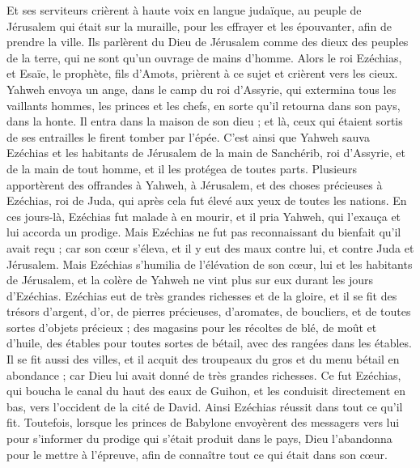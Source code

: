 \begin{multicols}{2}
Et ses serviteurs crièrent à haute voix en langue judaïque, au peuple de Jérusalem qui était sur la muraille, pour les effrayer et les épouvanter, afin de prendre la ville.
Ils parlèrent du Dieu de Jérusalem comme des dieux des peuples de la terre, qui ne sont qu'un ouvrage de mains d'homme.
Alors le roi Ezéchias, et Esaïe, le prophète, fils d'Amots, prièrent à ce sujet et crièrent vers les cieux.
Yahweh envoya un ange, dans le camp du roi d'Assyrie, qui extermina tous les vaillants hommes, les princes et les chefs, en sorte qu'il retourna dans son pays, dans la honte. Il entra dans la maison de son dieu ; et là, ceux qui étaient sortis de ses entrailles le firent tomber par l'épée.
C’est ainsi que Yahweh sauva Ezéchias et les habitants de Jérusalem de la main de Sanchérib, roi d'Assyrie, et de la main de tout homme, et il les protégea de toutes parts.
Plusieurs apportèrent des offrandes à Yahweh, à Jérusalem, et des choses précieuses à Ezéchias, roi de Juda, qui après cela fut élevé aux yeux de toutes les nations.
En ces jours-là, Ezéchias fut malade à en mourir, et il pria Yahweh, qui l'exauça et lui accorda un prodige.
Mais Ezéchias ne fut pas reconnaissant du bienfait qu'il avait reçu ; car son cœur s'éleva, et il y eut des maux contre lui, et contre Juda et Jérusalem.
Mais Ezéchias s'humilia de l'élévation de son cœur, lui et les habitants de Jérusalem, et la colère de Yahweh ne vint plus sur eux durant les jours d'Ezéchias.
Ezéchias eut de très grandes richesses et de la gloire, et il se fit des trésors d'argent, d'or, de pierres précieuses, d'aromates, de boucliers, et de toutes sortes d'objets précieux ;
des magasins pour les récoltes de blé, de moût et d’huile, des étables pour toutes sortes de bétail, avec des rangées dans les étables.
Il se fit aussi des villes, et il acquit des troupeaux du gros et du menu bétail en abondance ; car Dieu lui avait donné de très grandes richesses.
Ce fut Ezéchias, qui boucha le canal du haut des eaux de Guihon, et les conduisit directement en bas, vers l'occident de la cité de David. Ainsi Ezéchias réussit dans tout ce qu'il fit.
Toutefois, lorsque les princes de Babylone envoyèrent des messagers vers lui pour s'informer du prodige qui s’était produit dans le pays, Dieu l'abandonna pour le mettre à l'épreuve, afin de connaître tout ce qui était dans son cœur.

\end{multicols}
